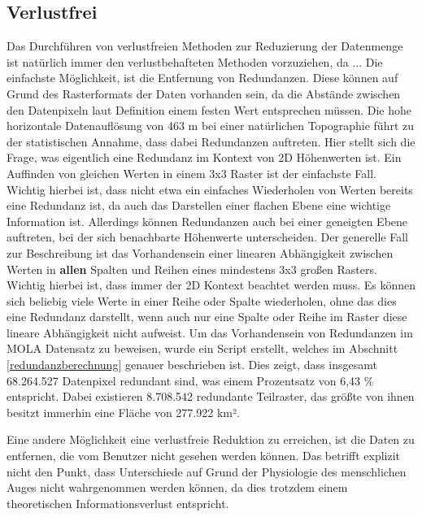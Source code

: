 \subsection{Verlustfrei}
Das Durchführen von verlustfreien Methoden zur Reduzierung der Datenmenge ist natürlich immer den verlustbehafteten Methoden vorzuziehen, da ...
Die einfachste Möglichkeit, ist die Entfernung von Redundanzen. Diese können auf Grund des Rasterformats der Daten vorhanden sein, da die Abstände zwischen den Datenpixeln laut Definition einem festen Wert entsprechen müssen. Die hohe horizontale Datenauflösung von 463 m bei einer natürlichen Topographie führt zu der statistischen Annahme, dass dabei Redundanzen auftreten. Hier stellt sich die Frage, was eigentlich eine Redundanz im Kontext von 2D Höhenwerten ist. Ein Auffinden von gleichen Werten in einem 3x3 Raster ist der einfachste Fall. Wichtig hierbei ist, dass nicht etwa ein einfaches Wiederholen von Werten bereits eine Redundanz ist, da auch das Darstellen einer flachen Ebene eine wichtige Information ist. Allerdings können Redundanzen auch bei einer geneigten Ebene auftreten, bei der sich benachbarte Höhenwerte unterscheiden. Der generelle Fall zur Beschreibung ist das Vorhandensein einer linearen Abhängigkeit zwischen Werten in \textbf{allen} Spalten und Reihen eines mindestens 3x3 großen Rasters\cite{topoDataReduction}. Wichtig hierbei ist, dass immer der 2D Kontext beachtet werden muss. Es können sich beliebig viele Werte in einer Reihe oder Spalte wiederholen, ohne das dies eine Redundanz darstellt, wenn auch nur eine Spalte oder Reihe im Raster diese lineare Abhängigkeit nicht aufweist. Um das Vorhandensein von Redundanzen im MOLA Datensatz zu beweisen, wurde ein Script erstellt, welches im Abschnitt \ref{redundanzberechnung} genauer beschrieben ist. Dies zeigt, dass insgesamt 68.264.527 Datenpixel redundant sind, was einem Prozentsatz von 6,43 \% entspricht. Dabei existieren 8.708.542 redundante Teilraster, das größte von ihnen besitzt immerhin eine Fläche von 277.922 km².

Eine andere Möglichkeit eine verlustfreie Reduktion zu erreichen, ist die Daten zu entfernen, die vom Benutzer nicht gesehen werden können. Das betrifft explizit nicht den Punkt, dass Unterschiede auf Grund der Physiologie des menschlichen Auges nicht wahrgenommen werden können, da dies trotzdem einem theoretischen Informationsverlust entspricht.


